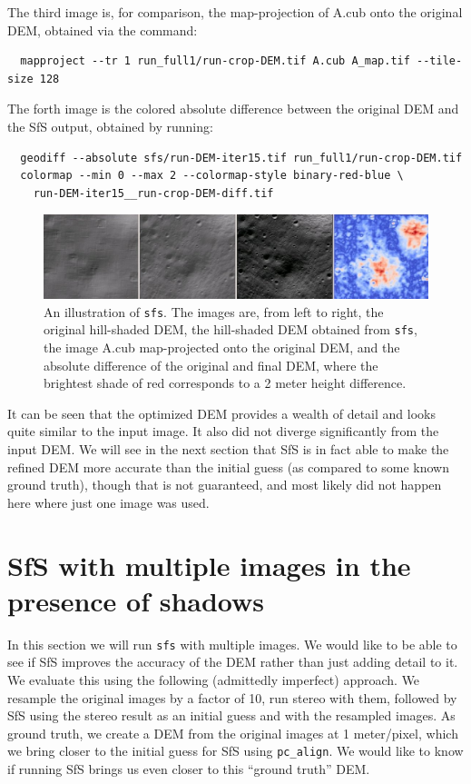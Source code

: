 The third image is, for comparison, the map-projection of A.cub onto the
original DEM, obtained via the command:
\begin{verbatim}
  mapproject --tr 1 run_full1/run-crop-DEM.tif A.cub A_map.tif --tile-size 128
\end{verbatim}
The forth image is the colored absolute difference between the original
DEM and the SfS output, obtained by running:
\begin{verbatim}
  geodiff --absolute sfs/run-DEM-iter15.tif run_full1/run-crop-DEM.tif
  colormap --min 0 --max 2 --colormap-style binary-red-blue \
    run-DEM-iter15__run-crop-DEM-diff.tif
\end{verbatim}
\begin{figure}[h!]
\begin{center}
\includegraphics[width=7in]{images/sfs1.jpg}
\caption[sfs]{An illustration of \texttt{sfs}. The images are, from
  left to right, the original hill-shaded DEM, the hill-shaded DEM obtained
from \texttt{sfs}, the image A.cub map-projected onto the original DEM,
and the absolute difference of the original and final DEM, where the brightest
shade of red corresponds to a 2 meter height difference.}
\label{fig:sfs1}
\end{center}
\end{figure}

It can be seen that the optimized DEM provides a wealth of detail and
looks quite similar to the input image. It also did not diverge
significantly from the input DEM. We will see in the next section that
SfS is in fact able to make the refined DEM more accurate than the
initial guess (as compared to some known ground truth), though that is
not guaranteed, and most likely did not happen here where just one image
was used.

\section{SfS with multiple images in the presence of shadows}

In this section we will run \texttt{sfs} with multiple images. We would
like to be able to see if SfS improves the accuracy of the DEM rather
than just adding detail to it. We evaluate this using the following
(admittedly imperfect) approach. We resample the original images by a
factor of 10, run stereo with them, followed by SfS using the stereo
result as an initial guess and with the resampled images. As ground
truth, we create a DEM from the original images at 1 meter/pixel, which
we bring closer to the initial guess for SfS using
\texttt{pc\_align}. We would like to know if running SfS brings us even
closer to this ``ground truth'' DEM.

